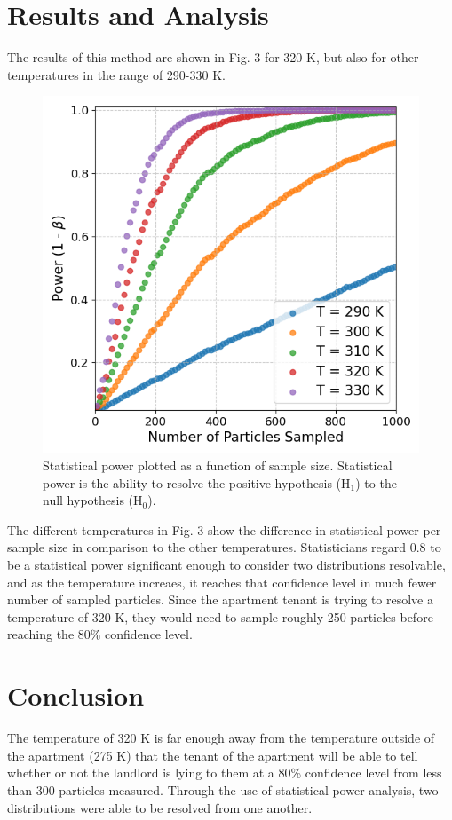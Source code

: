 \documentclass[%
 reprint,
 amsmath,amssymb,
 aps,
]{revtex4-2}
\begin{document}
\section{Results and Analysis}

The results of this method are shown in Fig. 3 for 320 K, but also for other temperatures in the range of 290-330 K.

\begin{figure}[h]
	\caption{Statistical power plotted as a function of sample size. Statistical power is the ability to resolve the positive hypothesis (H$_1$) to the null hypothesis (H$_0$). }
	\centering
	\includegraphics[scale=0.51]{results1.png}
\end{figure}

The different temperatures in Fig. 3 show the difference in statistical power per sample size in comparison to the other temperatures. Statisticians regard 0.8 to be a statistical power significant enough to consider two distributions resolvable, and as the temperature increaes, it reaches that confidence level in much fewer number of sampled particles. Since the apartment tenant is trying to resolve a temperature of 320 K, they would need to sample roughly 250 particles before reaching the 80\% confidence level.

\section{Conclusion}
The temperature of 320 K is far enough away from the temperature outside of the apartment (275 K) that the tenant of the apartment will be able to tell whether or not the landlord is lying to them at a 80\% confidence level from less than 300 particles measured. Through the use of statistical power analysis, two distributions were able to be resolved from one another. 
\end{document}
